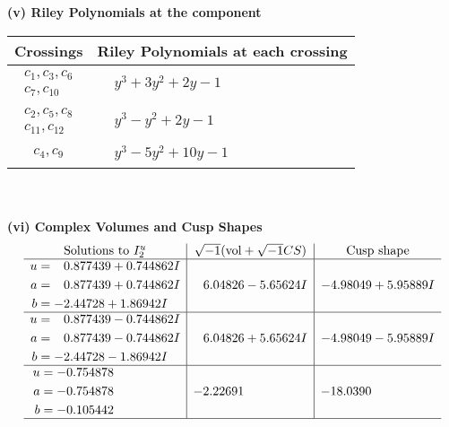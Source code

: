 \documentclass[1p]{elsarticle_modified}
\theoremstyle{definition}
\newcommand{\I}{\sqrt{-1}}
\begin{document}
\newpage\renewcommand{\arraystretch}{1}
\flushleft \textbf{(v) Riley Polynomials at the component}\newline \\
\begin{tabular}{m{50pt}|m{274pt}}
Crossings & \hspace{64pt}Riley Polynomials at each crossing \\
\hline $$\begin{aligned}c_{1},c_{3},c_{6}\\c_{7},c_{10}\end{aligned}$$&$\begin{aligned}
&y^3+3 y^2+2 y-1
\end{aligned}$\\
\hline $$\begin{aligned}c_{2},c_{5},c_{8}\\c_{11},c_{12}\end{aligned}$$&$\begin{aligned}
&y^3- y^2+2 y-1
\end{aligned}$\\
\hline $$\begin{aligned}c_{4},c_{9}\end{aligned}$$&$\begin{aligned}
&y^3-5 y^2+10 y-1
\end{aligned}$\\
\hline
\end{tabular}\\~\\
\newpage\flushleft \textbf{(vi) Complex Volumes and Cusp Shapes}
$$\begin{array}{c|c|c}  
\text{Solutions to }I^u_{2}& \I (\text{vol} + \sqrt{-1}CS) & \text{Cusp shape}\\
 \hline 
\begin{aligned}
u &= \phantom{-}0.877439 + 0.744862 I \\
a &= \phantom{-}0.877439 + 0.744862 I \\
b &= -2.44728 + 1.86942 I\end{aligned}
 & \phantom{-}6.04826 - 5.65624 I & -4.98049 + 5.95889 I \\ \hline\begin{aligned}
u &= \phantom{-}0.877439 - 0.744862 I \\
a &= \phantom{-}0.877439 - 0.744862 I \\
b &= -2.44728 - 1.86942 I\end{aligned}
 & \phantom{-}6.04826 + 5.65624 I & -4.98049 - 5.95889 I \\ \hline\begin{aligned}
u &= -0.754878\phantom{ +0.000000I} \\
a &= -0.754878\phantom{ +0.000000I} \\
b &= -0.105442\phantom{ +0.000000I}\end{aligned}
 & -2.22691\phantom{ +0.000000I} & -18.0390\phantom{ +0.000000I}\\
 \hline 
 \end{array}$$\newpage\newpage\renewcommand{\arraystretch}{1}
\end{document}
